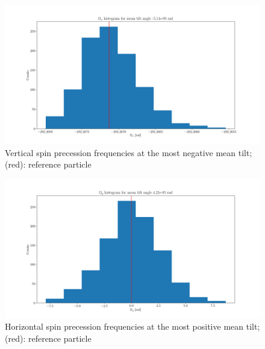 \documentclass[pdf]{beamer}
\begin{document}
	\begin{frame}
		\begin{figure}
			\includegraphics[scale=.3]{Wx_dK_hist_most_negative_mean_tilt}
			\caption{Vertical spin precession frequencies at the most negative mean tilt; (red): reference particle}
		\end{figure}
	\end{frame}
	\begin{frame}
		\begin{figure}
			\includegraphics[scale=.3]{Wy_dK_hist_most_positive_mean_tilt}
			\caption{Horizontal spin precession frequencies at the most positive mean tilt; (red): reference particle}
		\end{figure}
	\end{frame}
\end{document}
